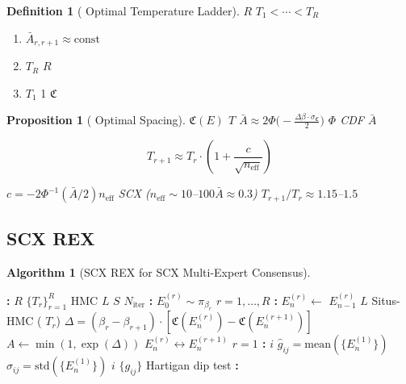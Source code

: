 \documentclass[12pt,a4paper]{article}
\theoremstyle{plain}
\newtheorem{proposition}[theorem]{ Proposition}
\theoremstyle{definition}
\newtheorem{definition}[theorem]{ Definition}
\newtheorem{algorithm-env}[theorem]{ Algorithm}
\newcommand{\Cercis}{\mathfrak{C}}
\begin{document}
\begin{definition}[ Optimal Temperature Ladder]
 $R$  $T_1 < \cdots < T_R$

\begin{enumerate}[label=(\roman*)]
    \item \textbf{} 
        $\bar{A}_{r,r+1} \approx \text{const}$
    \item \textbf{} $T_R$  $R$ 
    \item \textbf{} $T_1$  1  $\Cercis$ 
\end{enumerate}
\end{definition}

\begin{proposition}[ Optimal Spacing]
 $\Cercis(E)$  $T$ 
$\bar{A} \approx 2\Phi\!\big(-\frac{\Delta\beta \cdot \sigma_\Cercis}{2}\big)$
 $\Phi$  CDF $\bar{A}$

\begin{equation}\label{eq:temp_ladder}
    T_{r+1} \approx T_r \cdot \left(1 + \frac{c}{\sqrt{n_{\text{eff}}}}\right)
\end{equation}

 $c = -2\Phi^{-1}(\bar{A}/2)$$n_{\text{eff}}$ 
 SCX  ($n_{\text{eff}} \sim 10$–$100$$\bar{A} \approx 0.3$)
$T_{r+1}/T_r \approx 1.15$–$1.5$
\end{proposition}

\subsection{SCX  REX }

\begin{algorithm-env}[SCX  REX for SCX Multi-Expert Consensus]
\begin{algorithmic}[1]
\State \textbf{:}  $R$ $\{T_r\}_{r=1}^R$
         HMC  $L$ $S$ $N_{\text{iter}}$
\State \textbf{:}  $E_0^{(r)} \sim \pi_{\beta_r}$  $r=1,\ldots,R$
    \State \textbf{:}
     \Comment{}
        \State $E_n^{(r)} \leftarrow$  $E_{n-1}^{(r)}$  $L$  Situs-HMC
            ( $T_r$)
    \EndFor
     
            \State  $\Delta = (\beta_r - \beta_{r+1}) \cdot
                [\Cercis(E_n^{(r)}) - \Cercis(E_n^{(r+1)})]$
            \State $A \leftarrow \min(1, \exp(\Delta))$
                \State  $E_n^{(r)} \leftrightarrow E_n^{(r+1)}$
            \EndIf
        \EndFor
    \EndIf
\EndFor
\State \textbf{ $r=1$ :}
\State  $i$  $\hat{g}_{ij} = \text{mean}(\{E^{(1)}_n\})$ 
    $\hat{\sigma}_{ij} = \text{std}(\{E^{(1)}_n\})$
\State  $i$ $\{g_{ij}\}$ 
     Hartigan dip test
\State \textbf{:} 
\end{algorithmic}
\end{algorithm-env}
\end{document}
